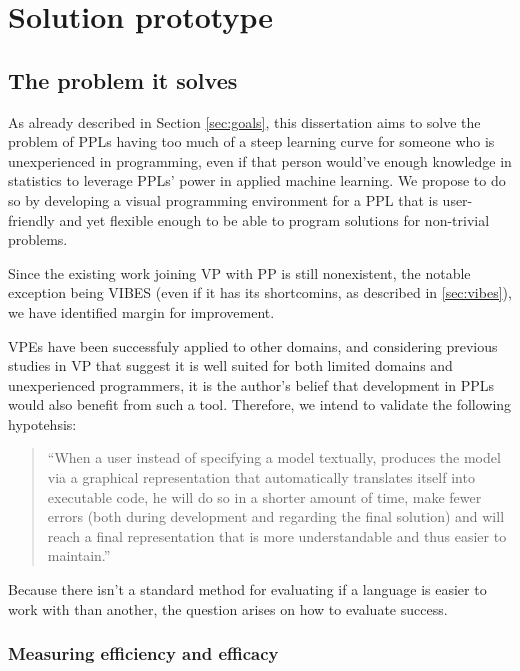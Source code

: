 \chapter{Solution prototype}\label{chap:chap3}


\section{The problem it solves}

As already described in Section \ref{sec:goals}, this dissertation aims to solve
the problem of PPLs having too much of a steep learning curve for someone who
is unexperienced in programming, even if that person would've enough knowledge
in statistics to leverage PPLs' power in applied machine learning. We propose
to do so by developing a visual programming environment for a PPL that is user-friendly
and yet flexible enough to be able to program solutions for non-trivial problems.

Since the existing work joining VP with PP is still nonexistent, the notable exception
being VIBES (even if it has its shortcomins, as described in \ref{sec:vibes}),
we have identified margin for improvement.

VPEs have been successfuly
applied to other domains, and considering previous studies in VP that suggest it is
well suited for both limited domains and unexperienced programmers, it is the
author's belief that development in PPLs would also benefit from such a tool.
Therefore, we intend to validate the following hypotehsis:

\begin{quote}
  ``When a user instead of specifying a model textually,
  produces the model via a graphical representation that automatically translates
  itself into executable code, he will do so in a shorter amount of time, make
  fewer errors (both during development and regarding the final solution) and
  will reach a final representation that is more understandable and thus
  easier to maintain.''
\end{quote}

Because there isn't a standard method for evaluating if a language is easier
to work with than another, the question arises on how to evaluate success.

\subsection{Measuring efficiency and efficacy}

